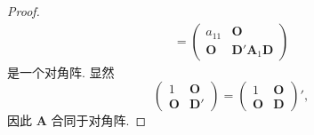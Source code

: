 \documentclass[../../main.tex]{subfiles}%
\begin{document}
\begin{proof}
\begin{align*}
=
\begin{pmatrix}
a_{11} & \boldsymbol{O} \\
\boldsymbol{O} & \boldsymbol{D}'\boldsymbol{A}_1\boldsymbol{D}
\end{pmatrix}
\end{align*}
是一个对角阵. 显然
\[
\begin{pmatrix}
1 & \boldsymbol{O} \\
\boldsymbol{O} & \boldsymbol{D}'
\end{pmatrix}
=
\begin{pmatrix}
1 & \boldsymbol{O} \\
\boldsymbol{O} & \boldsymbol{D}
\end{pmatrix}',
\]
因此 $\boldsymbol{A}$ 合同于对角阵.
\end{proof}
\end{document}
